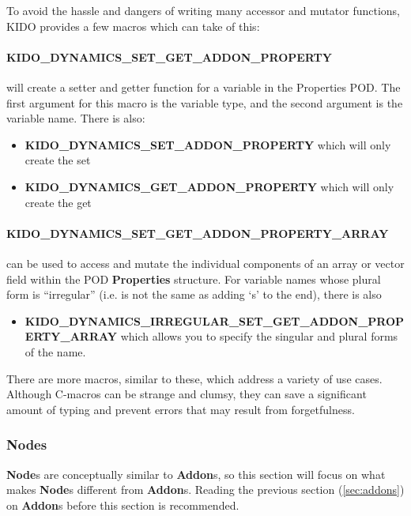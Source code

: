 To avoid the hassle and dangers of writing many accessor and mutator functions, KIDO provides a few macros which can take of this:

\paragraph{KIDO\_DYNAMICS\_SET\_GET\_ADDON\_PROPERTY} will create a setter and getter function for a variable in the Properties POD. The first argument for this macro is the variable type, and the second argument is the variable name. There is also:
\begin{itemize}
  \item \textbf{KIDO\_DYNAMICS\_SET\_ADDON\_PROPERTY} which will only create the set
  \item \textbf{KIDO\_DYNAMICS\_GET\_ADDON\_PROPERTY} which will only create the get
\end{itemize} 

\paragraph{KIDO\_DYNAMICS\_SET\_GET\_ADDON\_PROPERTY\_ARRAY} can be used to access and mutate the individual components of an array or vector field within the POD \textbf{Properties} structure. For variable names whose plural form is ``irregular'' (i.e. is not the same as adding `s' to the end), there is also 

\begin{itemize}
  \item \textbf{KIDO\_DYNAMICS\_IRREGULAR\_SET\_GET\_ADDON\_PROPERTY\_ARRAY} which allows you to specify the singular and plural forms of the name.
\end{itemize}

There are more macros, similar to these, which address a variety of use cases. Although C-macros can be strange and clumsy, they can save a significant amount of typing and prevent errors that may result from forgetfulness.

\subsubsection{Nodes}
\label{sec:nodes}

\textbf{Node}s are conceptually similar to \textbf{Addon}s, so this section will focus on what makes \textbf{Node}s different from \textbf{Addon}s. Reading the previous section (\ref{sec:addons}) on \textbf{Addon}s before this section is recommended.

